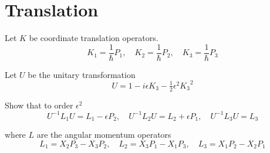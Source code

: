 

\section*{Translation}

Let $K$ be coordinate translation operators.
\begin{equation*}
K_1=\frac{1}{\hbar}P_1,\quad K_2=\frac{1}{\hbar}P_2,\quad K_3=\frac{1}{\hbar}P_3
\end{equation*}

Let $U$ be the unitary transformation
\begin{equation*}
U=1-i\epsilon K_3-\tfrac{1}{2}\epsilon^2{K_3}^2
\end{equation*}

Show that to order $\epsilon^2$
\begin{equation*}
U^{-1}L_1U=L_1-\epsilon P_2,\quad
U^{-1}L_2U=L_2+\epsilon P_1,\quad
U^{-1}L_3U=L_3
\end{equation*}

where $L$ are the angular momentum operators
\begin{equation*}
L_1=X_2P_3-X_3P_2,\quad
L_2=X_3P_1-X_1P_3,\quad
L_3=X_1P_2-X_2P_1
\end{equation*}



